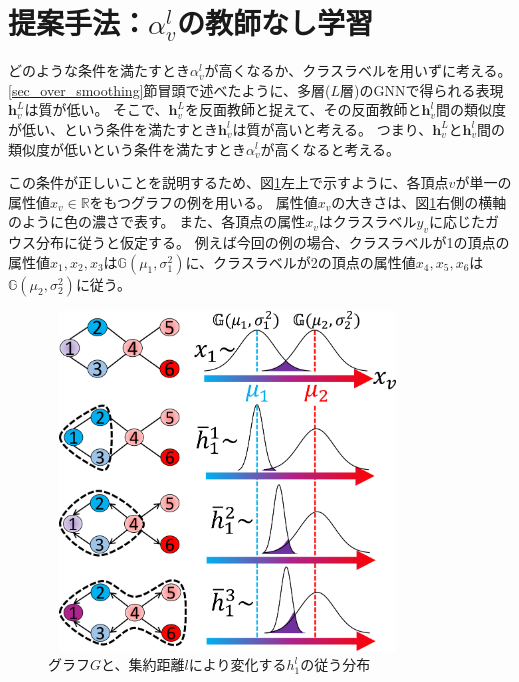 \documentclass[a4j,twocolumn]{jsarticle}
\begin{document}
\section{提案手法：$\alpha_v^l$の教師なし学習}
\label{sec_oversmoothing}

どのような条件を満たすとき$\alpha_v^l$が高くなるか、クラスラベルを用いずに考える。
\ref{sec_over_smoothing}節冒頭で述べたように、多層($L$層)のGNNで得られる表現$\bm{h}_v^L$は質が低い。
そこで、$\bm{h}_v^L$を反面教師と捉えて、その反面教師と$\bm{h}_v^l$間の類似度が低い、という条件を満たすとき$\bm{h}_v^l$は質が高いと考える。
つまり、$\bm{h}_v^L$と$\bm{h}_v^l$間の類似度が低いという条件を満たすとき$\alpha_v^l$が高くなると考える。

この条件が正しいことを説明するため、図\ref{fig_example2}左上で示すように、各頂点$v$が単一の属性値$x_v\in \mathbb{R}$をもつグラフの例を用いる。
属性値$x_v$の大きさは、図\ref{fig_example2}右側の横軸のように色の濃さで表す。
また、各頂点の属性$x_v$はクラスラベル$y_v$に応じたガウス分布に従うと仮定する。
例えば今回の例の場合、クラスラベルが1の頂点の属性値$x_1,x_2,x_3$は$\mathbb{G}(\mu_1, \sigma_1^2)$に、クラスラベルが2の頂点の属性値$x_4,x_5,x_6$は$\mathbb{G}(\mu_2, \sigma_2^2)$に従う。
\vspace{-1mm}

\begin{figure}[!h]
  \centering
  \includegraphics[height=9cm,width=9.5cm]{example2.pdf}
  \vspace{-6mm}
  \caption{グラフ$G$と、集約距離$l$により変化する$h_1^l$の従う分布}
  \label{fig_example2}
\end{figure}

\end{document}
